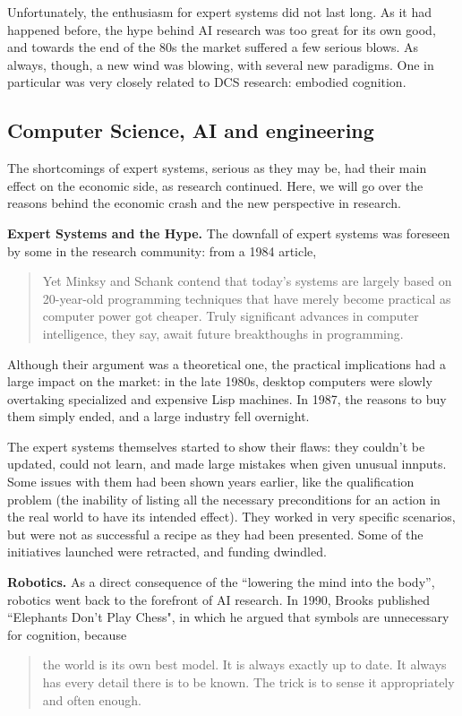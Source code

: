 \documentclass[../main.tex]{subfiles}
\begin{document}
Unfortunately, the enthusiasm for expert systems did not last long. As it had happened before, the hype behind AI research was too great for its own good, and towards the end of the 80s the market suffered a few serious blows. As always, though, a new wind was blowing, with several new paradigms. One in particular was very closely related to DCS research: embodied cognition.

\subsection{Computer Science, AI and engineering}
The shortcomings of expert systems, serious as they may be, had their main effect on the economic side, as research continued. Here, we will go over the reasons behind the economic crash and the new perspective in research.

\vspace{4pt}
\textbf{Expert Systems and the Hype.}
The downfall of expert systems was foreseen by some in the research community: from a 1984 article\cite{universityWhyComputersCan1984},
\begin{quote}
    Yet Minksy and Schank contend that today's systems are largely based on 20-year-old programming techniques that have merely become practical as computer power got cheaper. Truly significant advances in computer intelligence, they say, await future breakthoughs in programming.
\end{quote}

Although their argument was a theoretical one, the practical implications had a large impact on the market: in the late 1980s, desktop computers were slowly overtaking specialized and expensive Lisp machines. In 1987, the reasons to buy them simply ended, and a large industry fell overnight.

The expert systems themselves started to show their flaws: they couldn't be updated, could not learn, and made large mistakes when given unusual innputs. Some issues with them had been shown years earlier, like the qualification problem (the inability of listing all the necessary preconditions for an action in the real world to have its intended effect). They worked in very specific scenarios, but were not as successful a recipe as they had been presented. Some of the initiatives launched were retracted, and funding dwindled\cite{mccorduckMachinesWhoThink2004}.

\vspace{4pt}
\textbf{Robotics.} As a direct consequence of the ``lowering the mind into the body'', robotics went back to the forefront of AI research. In 1990, Brooks published ``Elephants Don't Play Chess"\cite{brooksElephantsDonPlay1990}, in which he argued that symbols are unnecessary for cognition, because
\begin{quote}
    the world is its own best model. It is always exactly up to date. It always has every detail there is to be known. The trick is to sense it appropriately and often enough.
\end{quote}
\end{document}
